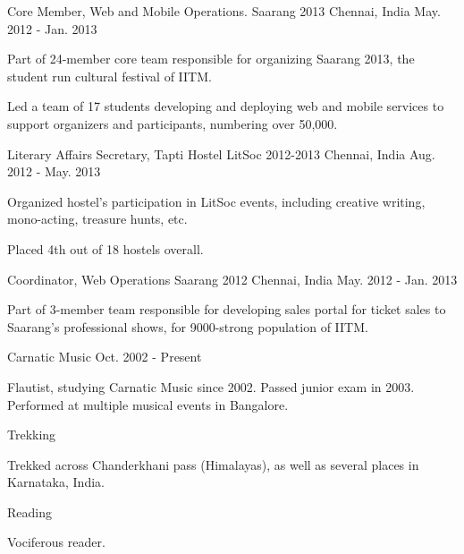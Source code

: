 \begin{cventries}
	\cventry
	{Core Member, Web and Mobile Operations.}
	{Saarang 2013}
	{Chennai, India}
	{May. 2012 - Jan. 2013}
	{
		\begin{cvitems}
		\item{Part of 24-member core team responsible for organizing Saarang 2013, the student run cultural festival of IITM.}
		\item{Led a team of 17 students developing and deploying web and mobile services to support organizers and participants, numbering over 50,000.}
		\end{cvitems}
	}

	\cventry
	{Literary Affairs Secretary, Tapti Hostel}
	{LitSoc 2012-2013}
	{Chennai, India}
	{Aug. 2012 - May. 2013}
	{
		\begin{cvitems}
		\item{Organized hostel's participation in LitSoc events, including creative writing, mono-acting, treasure hunts, etc.}
		\item{Placed 4th out of 18 hostels overall.}
		\end{cvitems}
	}

	\cventry
	{Coordinator, Web Operations}
	{Saarang 2012}
	{Chennai, India}
	{May. 2012 - Jan. 2013}
	{
		\begin{cvitems}
		\item{Part of 3-member team responsible for developing sales portal for ticket sales to Saarang's professional shows, for 9000-strong population of IITM.}
		\end{cvitems}
	}

	\cventry
	{}
	{Carnatic Music}
	{}
	{Oct. 2002 - Present}
	{
		\begin{cvitems}
		\item{Flautist, studying Carnatic Music since 2002. Passed junior exam in 2003. Performed at multiple musical events in Bangalore.}
		\end{cvitems}
	}

	\cventry
	{}
	{Trekking}
	{}
	{}
	{
		\begin{cvitems}
		\item{Trekked across Chanderkhani pass (Himalayas), as well as several places in Karnataka, India.}
		\end{cvitems}
	}

	\cventry
	{}
	{Reading}
	{}
	{}
	{
		\begin{cvitems}
		\item{Vociferous reader.}
		\end{cvitems}
	}

\end{cventries}
